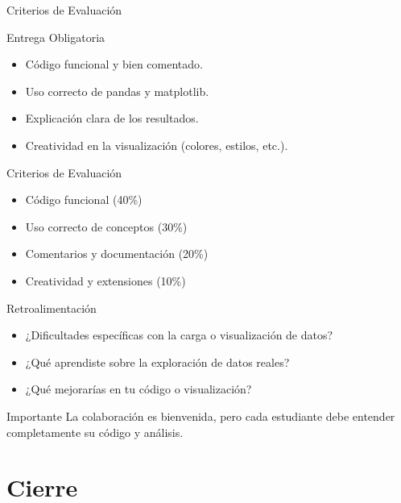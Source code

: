 \documentclass[10pt]{beamer}
\begin{document}
\begin{frame}{Criterios de Evaluación}
  \begin{block}{Entrega Obligatoria}
    \begin{itemize}
      \item Código funcional y bien comentado.
      \item Uso correcto de pandas y matplotlib.
      \item Explicación clara de los resultados.
      \item Creatividad en la visualización (colores, estilos, etc.).
    \end{itemize}
  \end{block}
  \begin{block}{Criterios de Evaluación}
    \begin{itemize}
      \item Código funcional (40\%)
      \item Uso correcto de conceptos (30\%)
      \item Comentarios y documentación (20\%)
      \item Creatividad y extensiones (10\%)
    \end{itemize}
  \end{block}
\end{frame}

\begin{frame}{Retroalimentación}
  \begin{itemize}
    \item ¿Dificultades específicas con la carga o visualización de datos?
    \item ¿Qué aprendiste sobre la exploración de datos reales?
    \item ¿Qué mejorarías en tu código o visualización?
  \end{itemize}
  \begin{alertblock}{Importante}
    La colaboración es bienvenida, pero cada estudiante debe entender completamente su código y análisis.
  \end{alertblock}
\end{frame}

\section{Cierre}
\end{document}
